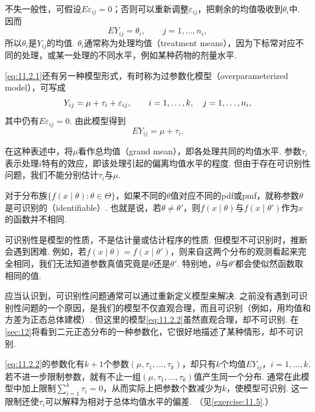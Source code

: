 不失一般性，可假设$E\varepsilon_{ij}=0$；否则可以重新调整$\varepsilon_{ij}$，把剩余的均值吸收到$\theta_i$中. 因而
$$
EY_{ij}=\theta_i,\qquad j=1,\ldots,n_i,
$$
所以$\theta_i$是$Y_{ij}$的均值. $\theta_i$通常称为处理均值（treatment means），因为下标常对应不同的处理，或某一处理的不同水平，例如某种药物的剂量水平.

\eqref{eq:11.2.1}还有另一种模型形式，有时称为过参数化模型（overparameterized model），可写成
\begin{equation}\label{eq:11.2.2}\index{SI0046@过参数化模型}\index{SI0741@方差分析}
Y_{ij}=\mu+\tau_i+\varepsilon_{ij},\qquad i=1,\ldots,k,\quad j=1,\ldots,n_i,
\end{equation}
其中仍有$E\varepsilon_{ij}=0$. 由此模型得到
$$EY_{ij}=\mu+\tau_i.$$

在这种表述中，将$\mu$看作总均值（grand mean），即各处理共同的均值水平. 参数$\tau_i$表示处理$i$特有的效应，即该处理引起的偏离均值水平的程度. 但由于存在可识别性问题，我们不能分别估计$\tau_i$与$\mu$.

\begin{definition}\label{def:11.2.2}
对于分布族$\{f(x\mid\theta):\theta\in\Theta\}$，如果不同的$\theta$值对应不同的pdf或pmf，就称参数$\theta$是可识别的（identifiable）. 也就是说，若$\theta\ne\theta'$，则$f(x\mid\theta)$与$f(x\mid\theta')$作为$x$的函数并不相同.
\end{definition}

可识别性是模型的性质，不是估计量或估计程序的性质. 但模型不可识别时，推断会遇到困难. 例如，若$f(x\mid\theta)=f(x\mid\theta')$，则来自这两个分布的观测看起来完全相同，我们无法知道参数真值究竟是$\theta$还是$\theta'$. 特别地，$\theta$与$\theta'$都会使似然函数取相同的值.

应当认识到，可识别性问题通常可以通过重新定义模型来解决. 之前没有遇到可识别性问题的一个原因，是我们的模型不仅直观合理，而且可识别（例如，用均值和方差为正态总体建模）. 但这里的模型\eqref{eq:11.2.2}虽然直观合理，却不可识别. 在\autoref{sec:12}将看到二元正态分布的一种参数化，它很好地描述了某种情形，却不可识别.

\eqref{eq:11.2.2}的参数化有$k+1$个参数$(\mu,\tau_1,\ldots,\tau_k)$，却只有$k$个均值$EY_{ij}$，$i=1,\ldots,k$. 若不进一步限制参数，就有不止一组$(\mu,\tau_1,\ldots,\tau_k)$值产生同一个分布. 通常在此模型中加上限制$\sum_{i=1}^k\tau_i=0$，从而实际上把参数个数减少为$k$，使模型可识别. 这一限制还使$\tau_i$可以解释为相对于总体均值水平的偏差. （见\autoref{exercise:11.5}.）


